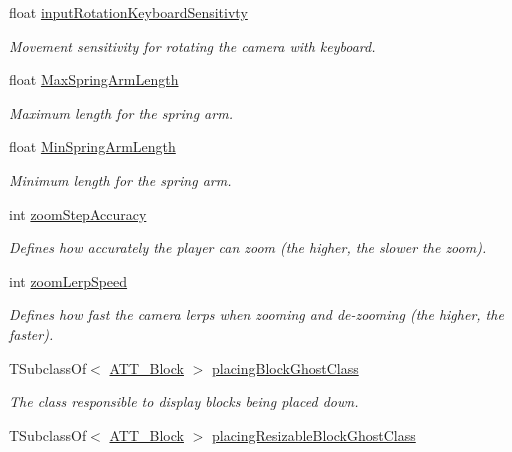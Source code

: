 \begin{DoxyCompactItemize}
float \mbox{\hyperlink{class_a_t_t___player_grid_camera_a98ed12d8e8e7a76cf5035f39617274cc}{input\+Rotation\+Keyboard\+Sensitivty}}
\begin{DoxyCompactList}\small\item\em Movement sensitivity for rotating the camera with keyboard. \end{DoxyCompactList}\item 
float \mbox{\hyperlink{class_a_t_t___player_grid_camera_a5e06acbaca3a6809893105f0d54bee11}{Max\+Spring\+Arm\+Length}}
\begin{DoxyCompactList}\small\item\em Maximum length for the spring arm. \end{DoxyCompactList}\item 
float \mbox{\hyperlink{class_a_t_t___player_grid_camera_a0f3b41c28b2cfe379ddca83c31ec9bf6}{Min\+Spring\+Arm\+Length}}
\begin{DoxyCompactList}\small\item\em Minimum length for the spring arm. \end{DoxyCompactList}\item 
int \mbox{\hyperlink{class_a_t_t___player_grid_camera_a840089f30c5196fae78441737475a82f}{zoom\+Step\+Accuracy}}
\begin{DoxyCompactList}\small\item\em Defines how accurately the player can zoom (the higher, the slower the zoom). \end{DoxyCompactList}\item 
int \mbox{\hyperlink{class_a_t_t___player_grid_camera_a33d3314f56995c1e6caed175dac6d98c}{zoom\+Lerp\+Speed}}
\begin{DoxyCompactList}\small\item\em Defines how fast the camera lerps when zooming and de-\/zooming (the higher, the faster). \end{DoxyCompactList}\item 
T\+Subclass\+Of$<$ \mbox{\hyperlink{class_a_t_t___block}{A\+T\+T\+\_\+\+Block}} $>$ \mbox{\hyperlink{class_a_t_t___player_grid_camera_a351c1412234109b4d816e0234bfccbf8}{placing\+Block\+Ghost\+Class}}
\begin{DoxyCompactList}\small\item\em The class responsible to display blocks being placed down. \end{DoxyCompactList}\item 
T\+Subclass\+Of$<$ \mbox{\hyperlink{class_a_t_t___block}{A\+T\+T\+\_\+\+Block}} $>$ \mbox{\hyperlink{class_a_t_t___player_grid_camera_a8a3c50c930057d70036ff6c9d39a72cc}{placing\+Resizable\+Block\+Ghost\+Class}}

\end{DoxyCompactItemize}
